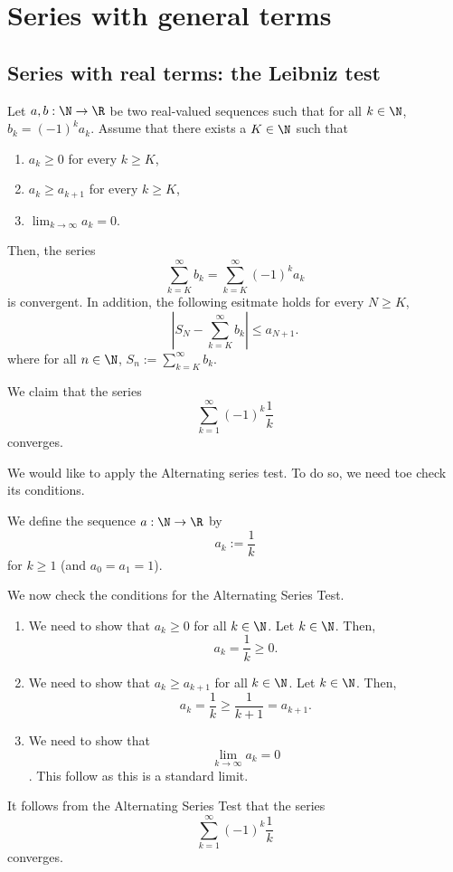 \section{Series with general terms}



\subsection{Series with real terms: the Leibniz test}
\begin{theorem}
    Let $a,b: \N \to \R$ be two real-valued sequences such that for all $k \in \N$, $b_k = (-1)^ka_k$. Assume that there exists a $K \in \N$ such that
    \begin{enumerate}
        \item $a_k \ge 0$ for every $k \ge K$,
        \item $a_k \ge a_{k+1}$ for every $k \ge K$,
        \item $\lim_{k \to \infty} a_k = 0$.
    \end{enumerate}
    Then, the series
    $$\sum_{k=K}^\infty b_k = \sum_{k=K}^\infty (-1)^k a_k$$
    is convergent. In addition, the following esitmate holds for every $N \ge K$,
    $$\left| S_N - \sum_{k=K}^\infty b_k \right| \le a_{N+1}.$$
    where for all $n \in \N$, $S_n := \sum_{k=K}^\infty b_k$.
\end{theorem}

\begin{example}
    We claim that the series
    $$\sum_{k=1}^\infty (-1)^k \frac{1}{k}$$
    converges.

    We would like to apply the Alternating series test. To do so, we need toe check its conditions.

    We define the sequence $a: \N \to \R$ by 
    $$a_k := \frac{1}{k}$$
    for $k \ge 1$ (and $a_0 = a_1 = 1$).

    We now check the conditions for the Alternating Series Test.

    \begin{enumerate}
        \item We need to show that $a_k \ge 0$ for all $k \in \N$. Let $k \in \N$. Then, 
            $$a_k = \frac{1}{k} \ge 0.$$ 
        \item We need to show that $a_k \ge a_{k+1}$ for all $k \in \N$. Let $k \in \N$. Then, 
            $$a_k = \frac{1}{k} \ge \frac{1}{k+1} = a_{k+1}.$$
        \item We need to show that
            $$\lim_{k\to\infty} a_k = 0$$.
            This follow as this is a standard limit.
    \end{enumerate}

    It follows from the Alternating Series Test that the series
    $$\sum_{k=1}^\infty (-1)^k \frac{1}{k}$$
    converges.
\end{example}


